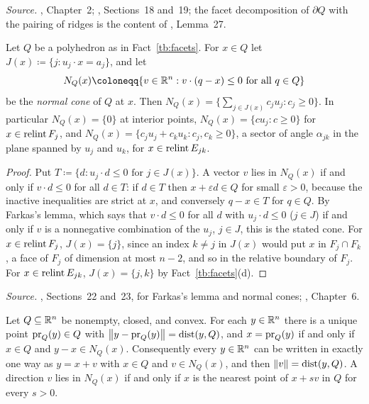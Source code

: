 \emph{Source.} , Chapter~2; , Sections~18 and~19;
the facet decomposition of \(\partial Q\) with the pairing of ridges is
the content of , Lemma~27.

\begin{fact}\label{tb:normalcone}
Let \(Q\) be a polyhedron as in Fact~\ref{tb:facets}. For \(x\in Q\) let
\(J(x)\coloneqq \{j:u_j\cdot x=a_j\}\), and let
\[
 N_Q(x)\coloneqq \{v\in\R^n:v\cdot(q-x)\le0\text{ for all }q\in Q\}
\]
be the \emph{normal cone} of \(Q\) at \(x\). Then
\(N_Q(x)=\{\sum_{j\in J(x)}c_ju_j:c_j\ge0\}\). In particular
\(N_Q(x)=\{0\}\) at interior points, \(N_Q(x)=\{cu_j:c\ge0\}\) for
\(x\in\operatorname{relint} F_j\), and \(N_Q(x)=\{c_ju_j+c_ku_k:c_j,c_k\ge0\}\), a sector of
angle \(\alpha_{jk}\) in the plane spanned by \(u_j\) and \(u_k\), for
\(x\in\operatorname{relint} E_{jk}\).
\end{fact}

\begin{proof}
Put \(T\coloneqq \{d:u_j\cdot d\le0\text{ for }j\in J(x)\}\). A vector \(v\) lies in
\(N_Q(x)\) if and only if \(v\cdot d\le0\) for all \(d\in T\): if \(d\in T\)
then \(x+\varepsilon d\in Q\) for small \(\varepsilon>0\), because the
inactive inequalities are strict at \(x\), and conversely \(q-x\in T\) for
\(q\in Q\). By Farkas's lemma, which says that \(v\cdot d\le0\) for all
\(d\) with \(u_j\cdot d\le0\) (\(j\in J\)) if and only if \(v\) is a
nonnegative combination of the \(u_j\), \(j\in J\), this is the stated
cone. For \(x\in\operatorname{relint} F_j\), \(J(x)=\{j\}\), since an index \(k\ne j\) in
\(J(x)\) would put \(x\) in \(F_j\cap F_k\), a face of \(F_j\) of dimension
at most \(n-2\), and so in the relative boundary of \(F_j\). For
\(x\in\operatorname{relint} E_{jk}\), \(J(x)=\{j,k\}\) by Fact~\ref{tb:facets}(d).
\end{proof}

\emph{Source.} , Sections~22 and~23, for Farkas's lemma and normal
cones; , Chapter~6.

\begin{fact}\label{tb:projection}
Let \(Q\subseteq\mathbb R^n\) be nonempty, closed, and convex. For each
\(y\in\mathbb R^n\) there is a unique point \(\operatorname{pr}_Q(y)\in Q\) with
\(\left\lVert y-\operatorname{pr}_Q(y)\right\rVert=\operatorname{dist}(y,Q)\), and \(x=\operatorname{pr}_Q(y)\) if and only if
\(x\in Q\) and \(y-x\in N_Q(x)\). Consequently every \(y\in\mathbb R^n\) can be
written in exactly one way as \(y=x+v\) with \(x\in Q\) and \(v\in N_Q(x)\),
and then \(\left\lVert v\right\rVert=\operatorname{dist}(y,Q)\). A direction \(v\) lies in \(N_Q(x)\) if and
only if \(x\) is the nearest point of \(x+s v\) in \(Q\) for every \(s>0\).
\end{fact}

